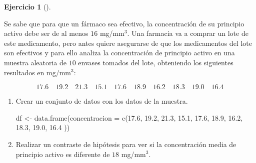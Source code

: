 \documentclass[
  a4paper,
]{scrreport}
\newenvironment{Shaded}{\begin{snugshade}}{\end{snugshade}}
\newcommand{\AttributeTok}[1]{\textcolor[rgb]{0.40,0.45,0.13}{#1}}
\newcommand{\FloatTok}[1]{\textcolor[rgb]{0.68,0.00,0.00}{#1}}
\newcommand{\FunctionTok}[1]{\textcolor[rgb]{0.28,0.35,0.67}{#1}}
\newcommand{\NormalTok}[1]{\textcolor[rgb]{0.00,0.23,0.31}{#1}}
\newcommand{\OtherTok}[1]{\textcolor[rgb]{0.00,0.23,0.31}{#1}}
\theoremstyle{definition}
\newtheorem{exercise}{Ejercicio}[chapter]
\theoremstyle{remark}
\begin{document}
\begin{exercise}[]\protect\hypertarget{exr-contraste-hipotesis-media-principio-activo}{}\label{exr-contraste-hipotesis-media-principio-activo}

Se sabe que para que un fármaco sea efectivo, la concentración de su
principio activo debe ser de al menos \(16\) mg/mm\(^3\). Una farmacia
va a comprar un lote de este medicamento, pero antes quiere asegurarse
de que los medicamentos del lote son efectivos y para ello analiza la
concentración de principio activo en una muestra aleatoria de \(10\)
envases tomados del lote, obteniendo los siguientes resultados en
mg/mm\(^{3}\):

\[
17.6 \quad 19.2 \quad 21.3 \quad 15.1 \quad 17.6 \quad 18.9 \quad 16.2 \quad 18.3 \quad 19.0 \quad 16.4
\]

\begin{enumerate}
\def\labelenumi{\alph{enumi}.}
\item
  Crear un conjunto de datos con los datos de la muestra.

  \begin{tcolorbox}[enhanced jigsaw, coltitle=black, left=2mm, colback=white, leftrule=.75mm, toptitle=1mm, breakable, bottomrule=.15mm, titlerule=0mm, bottomtitle=1mm, title=\textcolor{quarto-callout-tip-color}{\faLightbulb}\hspace{0.5em}{Solución}, arc=.35mm, toprule=.15mm, rightrule=.15mm, colframe=quarto-callout-tip-color-frame, opacityback=0, colbacktitle=quarto-callout-tip-color!10!white, opacitybacktitle=0.6]

\begin{Shaded}
\begin{Highlighting}[]
\NormalTok{df }\OtherTok{\textless{}{-}} \FunctionTok{data.frame}\NormalTok{(}\AttributeTok{concentracion =} \FunctionTok{c}\NormalTok{(}\FloatTok{17.6}\NormalTok{, }\FloatTok{19.2}\NormalTok{, }\FloatTok{21.3}\NormalTok{, }\FloatTok{15.1}\NormalTok{, }\FloatTok{17.6}\NormalTok{, }\FloatTok{18.9}\NormalTok{, }\FloatTok{16.2}\NormalTok{, }\FloatTok{18.3}\NormalTok{, }\FloatTok{19.0}\NormalTok{, }\FloatTok{16.4}\NormalTok{ ))}
\end{Highlighting}
\end{Shaded}

  \end{tcolorbox}
\item
  Realizar un contraste de hipótesis para ver si la concentración media
  de principio activo es diferente de \(18\) mg/mm\(^3\).

  \begin{tcolorbox}[enhanced jigsaw, coltitle=black, left=2mm, colback=white, leftrule=.75mm, toptitle=1mm, breakable, bottomrule=.15mm, titlerule=0mm, bottomtitle=1mm, title=\textcolor{quarto-callout-note-color}{\faInfo}\hspace{0.5em}{Ayuda}, arc=.35mm, toprule=.15mm, rightrule=.15mm, colframe=quarto-callout-note-color-frame, opacityback=0, colbacktitle=quarto-callout-note-color!10!white, opacitybacktitle=0.6]


\end{tcolorbox}
\end{enumerate}
\end{exercise}
\end{document}
